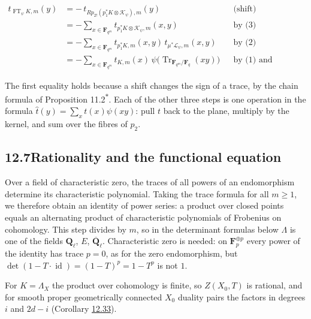 \documentclass[11pt]{article}
\newcommand{\bpout}[1]{#1\textsuperscript{\hyperlink{bp-outside}{\ensuremath{\ast}}}}
\begin{document}
\[
\begin{aligned}
t_{\operatorname{FT}_\psi K,m}(y)
&=-\,t_{Rp_{2!}(p_1^*K\otimes\mathcal K_\psi),m}(y)
&&\text{(shift)}\\
&=-\sum_{x\in\mathbf F_{q^m}}t_{p_1^*K\otimes\mathcal K_\psi,m}(x,y)
&&\text{by (3)}\\
&=-\sum_{x\in\mathbf F_{q^m}}t_{p_1^*K,m}(x,y)\,t_{\mu^*\mathcal L_\psi,m}(x,y)
&&\text{by (2)}\\
&=-\sum_{x\in\mathbf F_{q^m}}t_{K,m}(x)\,
\psi\bigl(\operatorname{Tr}_{\mathbf F_{q^m}/\mathbf F_q}(xy)\bigr)
&&\text{by (1) and Lemma~16.1.1.}
\end{aligned}
\]

The first equality holds because a shift changes the sign of a trace, by the chain formula of Proposition \bpout{11.2}. Each of the other three steps is one operation in the formula \(\hat t(y)=\sum_xt(x)\psi(xy)\): pull \(t\) back to the plane, multiply by the kernel, and sum over the fibres of \(p_2\).


\subsection*{\texorpdfstring{12.7\quad Rationality and the functional equation}{12.7 Rationality and the functional equation}}
\label{bp87}%
\label{bp88}%
Over a field of characteristic zero, the traces of all powers of an endomorphism determine its characteristic polynomial. Taking the trace formula for all \(m\geq1\), we therefore obtain an identity of power series: a product over closed points equals an alternating product of characteristic polynomials of Frobenius on cohomology. This step divides by \(m\), so in the determinant formulas below \(\Lambda\) is one of the fields \(\mathbf Q_\ell\), \(E\), \(\overline{\mathbf Q}_\ell\). Characteristic zero is needed: on \(\mathbf F_p^{\oplus p}\) every power of the identity has trace \(p=0\), as for the zero endomorphism, but \(\det(1-T\cdot\operatorname{id})=(1-T)^p=1-T^p\) is not \(1\).

For \(K=\Lambda_X\) the product over cohomology is finite, so \(Z(X_0,T)\) is rational, and for smooth proper geometrically connected \(X_0\) duality pairs the factors in degrees \(i\) and \(2d-i\) (Corollary \hyperref[bp100]{12.33}).
\end{document}

